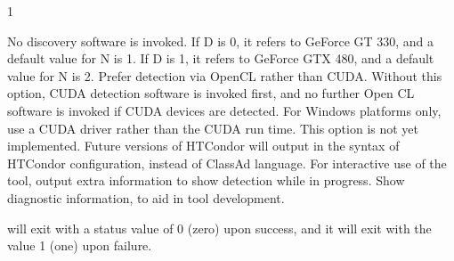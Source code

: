 \begin{ManPage}{\label{man-condor-gpu-discovery}}{1}
\begin{Options}
{    No discovery software is invoked.
    If D is 0, it refers to GeForce GT 330, and a default value for N is 1.
    If D is 1, it refers to GeForce GTX 480, and a default value for N is 2.
  }
   {
    Prefer detection via OpenCL rather than CUDA.
    Without this option, CUDA detection software is invoked first,
    and no further Open CL software is invoked if CUDA devices are detected.
  }
   {
    For Windows platforms only, use a CUDA driver rather than the
    CUDA run time.
  }
   {
    This option is not yet implemented.
    Future versions of HTCondor will output in the syntax of 
    HTCondor configuration, instead of ClassAd language.
  }
   {
    For interactive use of the tool, output extra information to show 
    detection while in progress.
  }
   {
    Show diagnostic information, to aid in tool development.
  }
\end{Options}

\ExitStatus

 will exit with a status value of 0 (zero) upon success,
and it will exit with the value 1 (one) upon failure.


\end{ManPage}
